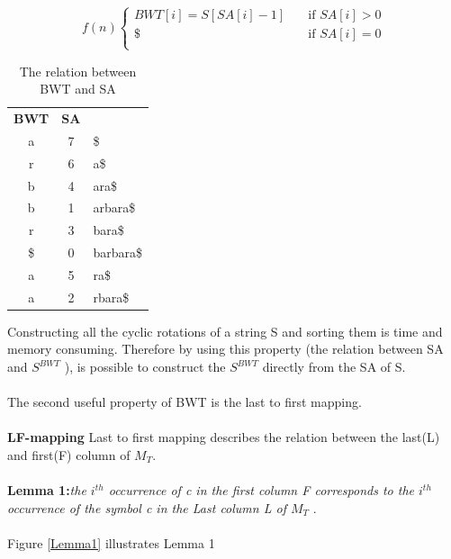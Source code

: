 \documentclass[11pt,a4paper]{report}
\begin{document}
\[ f(n)
\begin{cases}
    BWT[i]=S[SA[i]-1]   & \quad \text{if } SA[i] > 0\\
    \$  & \quad \text{if } SA[i]= 0\\
\end{cases}
\]


\begin{table}[h]
\centering
  \begin{tabular}{ c c l}
  \textbf{  BWT} & \textbf{SA } & \\ 
       a 	&	 7	 &   \$\\  
       r 	&	 6	 &	 a\$ \\
       b 	&	 4	 &	 ara\$ \\
       b 	&	 1	 &	 arbara\$ \\
       r  	&	 3	 &	 bara\$ \\
      \$ 	&	 0	 &	 barbara\$ \\
       a 	&	 5	 &	 ra\$ \\
       a 	&	 2	 &	 rbara\$ \\

  \end{tabular}
  
\caption{The relation between BWT and SA}
\label{BWT&SA}
\end{table}

Constructing all the cyclic rotations of a string S and sorting 
them is time and memory consuming. 
Therefore by using this property (the relation between SA and 
$S^{BWT}$ ), is possible to construct the $S^{BWT}$ directly 
from the SA of S.
\\\\
The second useful property of BWT is the last to first mapping.\\\\
\textbf{LF-mapping}  Last to first mapping describes the relation 
between the last(L) and first(F) column of $M_{T}$\cite{bwt}.\\\\
\textbf{Lemma 1:}\emph{the $i^{th}$ occurrence of c in the first 
column \emph{F} corresponds to the $i^{th}$ occurrence of the symbol 
c in the Last column \emph{L} of $M_{T}$} \cite{bwt}.\\\\
Figure \ref{Lemma1} illustrates Lemma 1\\
\end{document}
